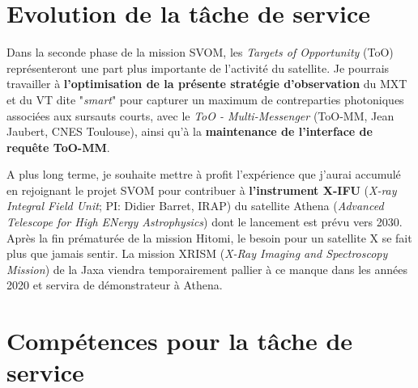 \documentclass[12pt,onecolumn]{article}
\begin{document}
\section{Evolution de la tâche de service}

Dans la seconde phase de la mission SVOM, les \textit{Targets of Opportunity} (ToO) représenteront une part plus importante de l'activité du satellite. Je pourrais travailler à \textbf{l'optimisation de la présente stratégie d'observation} du MXT et du VT dite "\textit{smart}" pour capturer un maximum de contreparties photoniques associées aux sursauts courts, avec le \textit{ToO - Multi-Messenger} (ToO-MM, Jean Jaubert, CNES Toulouse), ainsi qu'à la \textbf{maintenance de l'interface de requête ToO-MM}.

A plus long terme, je souhaite mettre à profit l'expérience que j'aurai accumulé en rejoignant le projet SVOM pour contribuer à \textbf{l'instrument X-IFU} (\textit{X-ray Integral Field Unit}; PI: Didier Barret, IRAP) du satellite Athena (\textit{Advanced Telescope for High ENergy Astrophysics}) dont le lancement est prévu vers 2030. Après la fin prématurée de la mission Hitomi, le besoin pour un satellite X se fait plus que jamais sentir. La mission XRISM (\textit{X-Ray Imaging and Spectroscopy Mission}) de la Jaxa viendra temporairement pallier à ce manque dans les années 2020 et servira de démonstrateur à Athena.

%

\section{Compétences pour la tâche de service}
\end{document}
